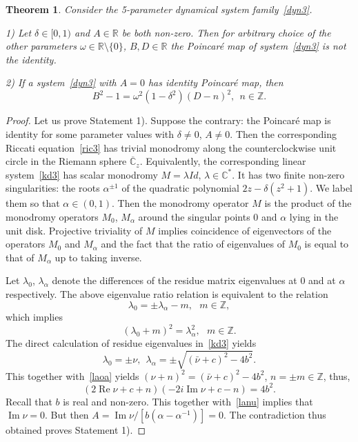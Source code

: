 \documentclass[preprint,12pt]{elsarticle}
\theoremstyle{plain}
\newtheorem{theorem}{Theorem}
\DeclareMathOperator{\im}{\mathrm{Im}}
\DeclareMathOperator{\re}{\mathrm{Re}}
\def\a{\alpha}
\numberwithin{equation}{section}
\numberwithin{equation}{section}
\begin{document}
\begin{theorem} \label{montr} Consider the 5-parameter dynamical system family~\eqref{dyn3}. 

1) Let  $\delta\in[0,1)$ and $A\in\mathbb{R}$ be both non-zero. Then 
for arbitrary choice of the other parameters $\omega\in\mathbb R\setminus\{0\}$, $B,D\in\mathbb{R}$ 
the Poincar\'e map of system~\eqref{dyn3} is not the identity. 

2) If a system~\eqref{dyn3} with $A=0$ has identity Poincar\'e map, then 
\begin{equation}B^2-1=\omega^2(1-\delta^2)(D-n)^2, \ \ n\in\mathbb{Z}.\label{montriv}\end{equation}
\end{theorem}
\begin{proof} Let us prove Statement 1). Suppose the contrary: the Poincar\'e map is identity for some parameter values with $\delta\neq 0$, $A\neq0$. Then the corresponding Riccati equation~\eqref{ric3} has trivial monodromy along the counterclockwise unit circle in the Riemann sphere $\overline{\mathbb{C}}_z$. Equivalently, the corresponding linear system~\eqref{kd3} has scalar monodromy $M=\lambda Id$, $\lambda\in\mathbb{C}^*$. It has two finite non-zero singularities: the roots $\alpha^{\pm1}$ of the quadratic polynomial $2z-\delta(z^2+1)$. We label them  so that $\alpha\in(0,1)$. Then the monodromy operator $M$ is the product of the monodromy operators $M_0$, $M_\alpha$ around the singular points $0$ and $\alpha$ lying in the unit disk. Projective triviality of $M$ implies coincidence of eigenvectors of the operators  $M_0$ and $M_\alpha$ and the fact that the ratio of eigenvalues of $M_0$ is equal to that of $M_\alpha$ up to taking inverse. 

Let $\lambda_0$, $\lambda_{\alpha}$ denote the differences of the residue matrix eigenvalues at $0$ and at $\alpha$ respectively. The above eigenvalue ratio relation is equivalent to  the relation 
$$\lambda_0=\pm\lambda_{\alpha}-m, \ \ \ m\in\mathbb{Z},$$
which implies 
\begin{equation}(\lambda_0+m)^2=\lambda_\alpha^2, \ \ \ m\in\mathbb{Z}.\label{laoa}\end{equation}
The direct calculation of residue eigenvalues in~\eqref{kd3} yields
$$\lambda_0=\pm\nu, \ \ \lambda_{\alpha}=\pm\sqrt{(\bar\nu+c)^2-4b^2}.$$
This together with~\eqref{laoa} yields $(\nu+n)^2=(\bar\nu+c)^2-4b^2$, $n=\pm m\in\mathbb{Z}$, thus, 
\begin{equation}(2\re\nu+c+n)(-2i\im\nu+c-n)=4b^2.\label{lanu}\end{equation}
Recall that $b$ is real and non-zero. This together with~\eqref{lanu} implies that 
$\im\nu=0$. But then $A=\im\nu/[b(\a-\a^{-1})]=0$. The contradiction thus obtained 
proves Statement 1).


\end{proof}
\end{document}

